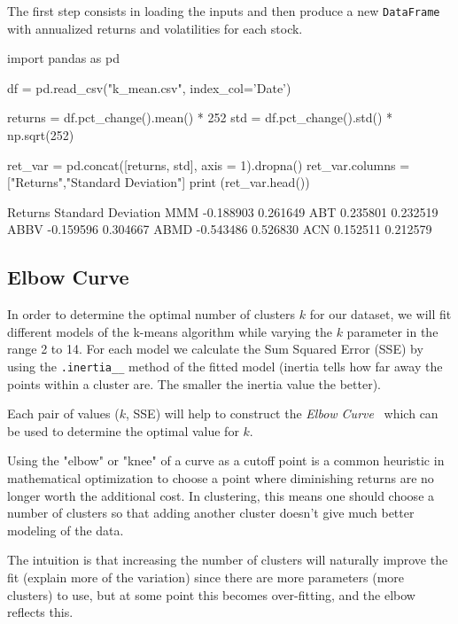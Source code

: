 The first step consists in loading the inputs and then produce a new \texttt{DataFrame} with annualized returns and volatilities for each stock. 
 
\begin{ipythonnon}
import pandas as pd
 
df = pd.read_csv("k_mean.csv", index_col='Date')
 
returns = df.pct_change().mean() * 252
std = df.pct_change().std() * np.sqrt(252)
 
ret_var = pd.concat([returns, std], axis = 1).dropna()
ret_var.columns = ["Returns","Standard Deviation"]
print (ret_var.head())
\end{ipythonnon}
\begin{ioutput}
       Returns  Standard Deviation
MMM  -0.188903            0.261649
ABT   0.235801            0.232519
ABBV -0.159596            0.304667
ABMD -0.543486            0.526830
ACN   0.152511            0.212579
\end{ioutput}

\subsection{Elbow Curve}
 
In order to determine the optimal number of clusters $k$ for our dataset, we will fit different models of the k-means algorithm while varying the $k$ parameter in the range 2 to 14. For each model we calculate the Sum Squared Error (SSE) by using the \texttt{.inertia\_\_} method of the fitted model (inertia tells how far away the points within a cluster are. The smaller the inertia value the better).
 
Each pair of values ($k$, SSE) will help to construct the \emph{Elbow Curve}~\cite{bib:elbow_curve} which can be used to determine the optimal value for $k$. 
 
Using the "elbow" or "knee" of a curve as a cutoff point is a common heuristic in mathematical optimization to choose a point where diminishing returns are no longer worth the additional cost. In clustering, this means one should choose a number of clusters so that adding another cluster doesn't give much better modeling of the data.
 
The intuition is that increasing the number of clusters will naturally improve the fit (explain more of the variation) since there are more parameters (more clusters) to use, but at some point this becomes over-fitting, and the elbow reflects this. 
 
